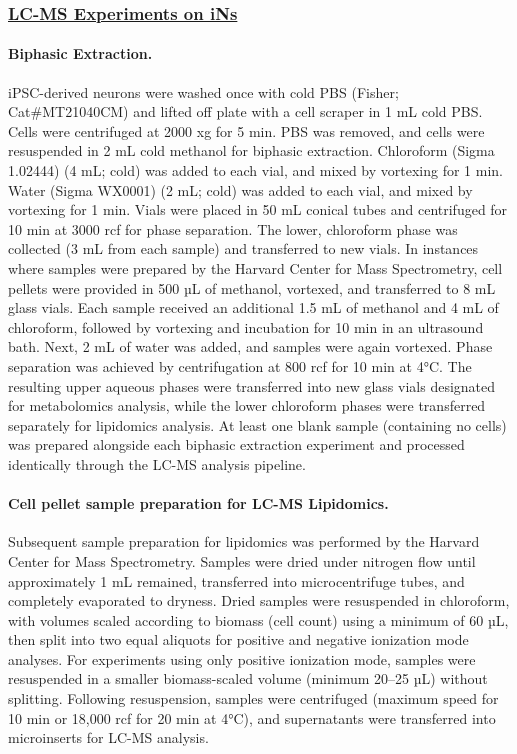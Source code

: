 \subsubsection{\underline{LC-MS Experiments on iNs}} 

\paragraph{Biphasic Extraction.} 
iPSC-derived neurons were washed once with cold PBS (Fisher; Cat\#MT21040CM) and lifted off plate with a cell scraper in 1 mL cold PBS. Cells were centrifuged at 2000 xg for 5 min. PBS was removed, and cells were resuspended in 2 mL cold methanol for biphasic extraction. Chloroform (Sigma 1.02444) (4 mL; cold) was added to each vial, and mixed by vortexing for 1 min. Water (Sigma WX0001) (2 mL; cold) was added to each vial, and mixed by vortexing for 1 min. Vials were placed in 50 mL conical tubes and centrifuged for 10 min at 3000 rcf for phase separation. The lower, chloroform phase was collected (3 mL from each sample) and transferred to new vials. 
In instances where samples were prepared by the Harvard Center for Mass Spectrometry, cell pellets were provided in 500 µL of methanol, vortexed, and transferred to 8 mL glass vials. Each sample received an additional 1.5 mL of methanol and 4 mL of chloroform, followed by vortexing and incubation for 10 min in an ultrasound bath. Next, 2 mL of water was added, and samples were again vortexed. Phase separation was achieved by centrifugation at 800 rcf for 10 min at 4°C. The resulting upper aqueous phases were transferred into new glass vials designated for metabolomics analysis, while the lower chloroform phases were transferred separately for lipidomics analysis.
At least one blank sample (containing no cells) was prepared alongside each biphasic extraction experiment and processed identically through the LC-MS analysis pipeline.

\paragraph{Cell pellet sample preparation for LC-MS Lipidomics.} 
Subsequent sample preparation for lipidomics was performed by the Harvard Center for Mass Spectrometry. Samples were dried under nitrogen flow until approximately 1 mL remained, transferred into microcentrifuge tubes, and completely evaporated to dryness. Dried samples were resuspended in chloroform, with volumes scaled according to biomass (cell count) using a minimum of 60 µL, then split into two equal aliquots for positive and negative ionization mode analyses. For experiments using only positive ionization mode, samples were resuspended in a smaller biomass-scaled volume (minimum 20–25 µL) without splitting. Following resuspension, samples were centrifuged (maximum speed for 10 min or 18,000 rcf for 20 min at 4°C), and supernatants were transferred into microinserts for LC-MS analysis.

